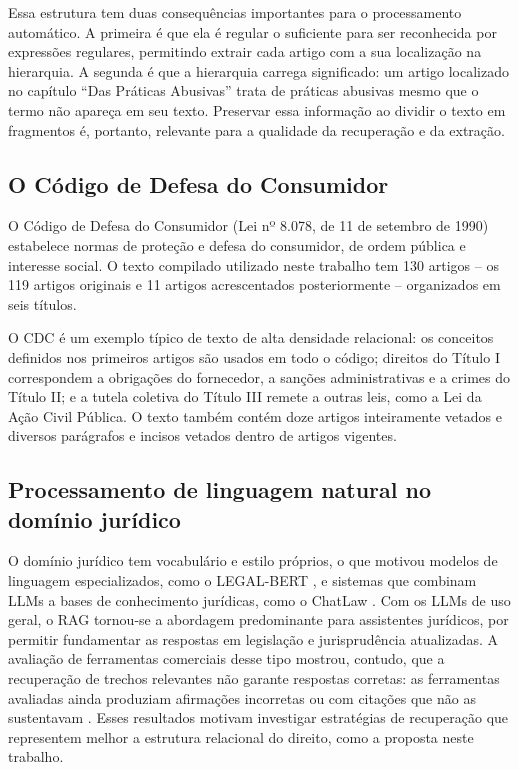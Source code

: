 Essa estrutura tem duas consequências importantes para o processamento automático. A primeira é que ela é regular o suficiente para ser reconhecida por expressões regulares, permitindo extrair cada artigo com a sua localização na hierarquia. A segunda é que a hierarquia carrega significado: um artigo localizado no capítulo ``Das Práticas Abusivas'' trata de práticas abusivas mesmo que o termo não apareça em seu texto. Preservar essa informação ao dividir o texto em fragmentos é, portanto, relevante para a qualidade da recuperação e da extração.

\subsection{O Código de Defesa do Consumidor}
\label{sec-referencial-juridico-cdc}

O Código de Defesa do Consumidor (Lei nº 8.078, de 11 de setembro de 1990) \cite{brasil1990cdc} estabelece normas de proteção e defesa do consumidor, de ordem pública e interesse social. O texto compilado utilizado neste trabalho tem 130 artigos -- os 119 artigos originais e 11 artigos acrescentados posteriormente -- organizados em seis títulos.


O CDC é um exemplo típico de texto de alta densidade relacional: os conceitos definidos nos primeiros artigos são usados em todo o código; direitos do Título I correspondem a obrigações do fornecedor, a sanções administrativas e a crimes do Título II; e a tutela coletiva do Título III remete a outras leis, como a Lei da Ação Civil Pública. O texto também contém doze artigos inteiramente vetados e diversos parágrafos e incisos vetados dentro de artigos vigentes.

\subsection{Processamento de linguagem natural no domínio jurídico}
\label{sec-referencial-juridico-pln}

O domínio jurídico tem vocabulário e estilo próprios, o que motivou modelos de linguagem especializados, como o LEGAL-BERT \cite{chalkidis2020legal}, e sistemas que combinam LLMs a bases de conhecimento jurídicas, como o ChatLaw \cite{cui2023chatlaw}. Com os LLMs de uso geral, o RAG tornou-se a abordagem predominante para assistentes jurídicos, por permitir fundamentar as respostas em legislação e jurisprudência atualizadas. A avaliação de ferramentas comerciais desse tipo mostrou, contudo, que a recuperação de trechos relevantes não garante respostas corretas: as ferramentas avaliadas ainda produziam afirmações incorretas ou com citações que não as sustentavam \cite{magesh2024hallucination}. Esses resultados motivam investigar estratégias de recuperação que representem melhor a estrutura relacional do direito, como a proposta neste trabalho.

